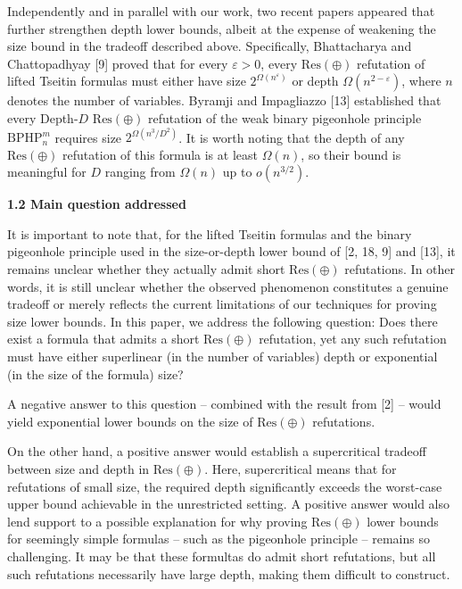 Independently and in parallel with our work, two recent papers appeared that further strengthen depth lower bounds, albeit at the expense of weakening the size bound in the tradeoff described above. Specifically, Bhattacharya and Chattopadhyay [9] proved that for every $\varepsilon>0$, every $\mathrm{Res}(\oplus)$ refutation of lifted Tseitin formulas must either have size $2^{\Omega(n^{\varepsilon})}$ or depth $\Omega(n^{2-\varepsilon})$, where $n$ denotes the number of variables.
Byramji and Impagliazzo [13] established that every Depth-$D$ $\mathrm{Res}(\oplus)$ refutation of the weak binary pigeonhole principle $\mathrm{BPHP}^{m}_{n}$ requires size $2^{\Omega(n^{3}/D^{2})}$. It is worth noting that the depth of any $\mathrm{Res}(\oplus)$ refutation of this formula is at least $\Omega(n)$, so their bound is meaningful for $D$ ranging from $\Omega(n)$ up to $o(n^{3/2})$.\par


\par\medskip\noindent\textbf{
1.2 Main question addressed}\par


It is important to note that, for the lifted Tseitin formulas and the binary pigeonhole principle used in the size-or-depth lower bound of [2, 18, 9] and [13],
it remains unclear whether they actually admit short $\mathrm{Res}(\oplus)$ refutations.
In other words, it is still unclear whether the observed phenomenon constitutes a genuine tradeoff or merely reflects
the current limitations of our techniques for proving size lower bounds.
In this paper, we address the following question: Does there exist a formula that admits a
short $\mathrm{Res}(\oplus)$ refutation, yet any such refutation must have either superlinear
(in the number of variables) depth or exponential (in the size of the formula) size?\par



A negative answer to this question – combined with the result from [2] –
would yield exponential lower bounds on the size of $\operatorname{\mathrm{Res}(\oplus)}$ refutations.\par



On the other hand, a positive answer would establish a supercritical tradeoff
between size and depth in $\operatorname{\mathrm{Res}(\oplus)}$.
Here, supercritical means that for refutations of small size, the required depth
significantly exceeds the worst-case upper bound achievable in the unrestricted setting.
A positive answer would also lend support to a possible explanation for why proving
$\mathrm{Res}(\oplus)$ lower bounds for seemingly simple formulas – such as the pigeonhole
principle – remains so challenging.
It may be that these formultas do admit short refutations, but all such refutations
necessarily have large depth, making them difficult to construct.\par



